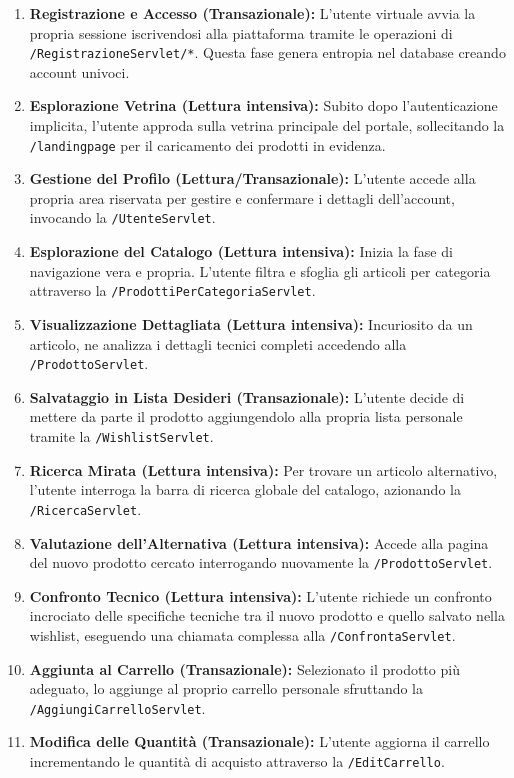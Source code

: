 \begin{enumerate}
    \item \textbf{Registrazione e Accesso (Transazionale):} L'utente virtuale avvia la propria sessione iscrivendosi alla piattaforma tramite le operazioni di \texttt{/RegistrazioneServlet/*}. Questa fase genera entropia nel database creando account univoci.
    \item \textbf{Esplorazione Vetrina (Lettura intensiva):} Subito dopo l'autenticazione implicita, l'utente approda sulla vetrina principale del portale, sollecitando la \texttt{/landingpage} per il caricamento dei prodotti in evidenza.
    \item \textbf{Gestione del Profilo (Lettura/Transazionale):} L'utente accede alla propria area riservata per gestire e confermare i dettagli dell'account, invocando la \texttt{/UtenteServlet}.
    \item \textbf{Esplorazione del Catalogo (Lettura intensiva):} Inizia la fase di navigazione vera e propria. L'utente filtra e sfoglia gli articoli per categoria attraverso la \texttt{/ProdottiPerCategoriaServlet}.
    \item \textbf{Visualizzazione Dettagliata (Lettura intensiva):} Incuriosito da un articolo, ne analizza i dettagli tecnici completi accedendo alla \texttt{/ProdottoServlet}.
    \item \textbf{Salvataggio in Lista Desideri (Transazionale):} L'utente decide di mettere da parte il prodotto aggiungendolo alla propria lista personale tramite la \texttt{/WishlistServlet}.
    \item \textbf{Ricerca Mirata (Lettura intensiva):} Per trovare un articolo alternativo, l'utente interroga la barra di ricerca globale del catalogo, azionando la \texttt{/RicercaServlet}.
    \item \textbf{Valutazione dell'Alternativa (Lettura intensiva):} Accede alla pagina del nuovo prodotto cercato interrogando nuovamente la \texttt{/ProdottoServlet}.
    \item \textbf{Confronto Tecnico (Lettura intensiva):} L'utente richiede un confronto incrociato delle specifiche tecniche tra il nuovo prodotto e quello salvato nella wishlist, eseguendo una chiamata complessa alla \texttt{/ConfrontaServlet}.
    \item \textbf{Aggiunta al Carrello (Transazionale):} Selezionato il prodotto più adeguato, lo aggiunge al proprio carrello personale sfruttando la \texttt{/AggiungiCarrelloServlet}.
    \item \textbf{Modifica delle Quantità (Transazionale):} L'utente aggiorna il carrello incrementando le quantità di acquisto attraverso la \texttt{/EditCarrello}.

\end{enumerate}
